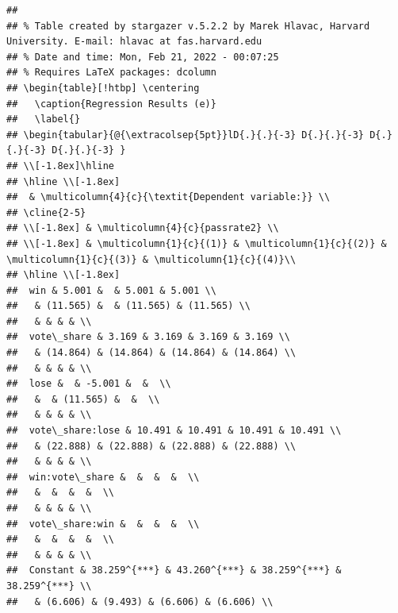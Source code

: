 \documentclass[
  12pt,
  landscape]{article}
\begin{document}
\begin{verbatim}
## 
## % Table created by stargazer v.5.2.2 by Marek Hlavac, Harvard University. E-mail: hlavac at fas.harvard.edu
## % Date and time: Mon, Feb 21, 2022 - 00:07:25
## % Requires LaTeX packages: dcolumn 
## \begin{table}[!htbp] \centering 
##   \caption{Regression Results (e)} 
##   \label{} 
## \begin{tabular}{@{\extracolsep{5pt}}lD{.}{.}{-3} D{.}{.}{-3} D{.}{.}{-3} D{.}{.}{-3} } 
## \\[-1.8ex]\hline 
## \hline \\[-1.8ex] 
##  & \multicolumn{4}{c}{\textit{Dependent variable:}} \\ 
## \cline{2-5} 
## \\[-1.8ex] & \multicolumn{4}{c}{passrate2} \\ 
## \\[-1.8ex] & \multicolumn{1}{c}{(1)} & \multicolumn{1}{c}{(2)} & \multicolumn{1}{c}{(3)} & \multicolumn{1}{c}{(4)}\\ 
## \hline \\[-1.8ex] 
##  win & 5.001 &  & 5.001 & 5.001 \\ 
##   & (11.565) &  & (11.565) & (11.565) \\ 
##   & & & & \\ 
##  vote\_share & 3.169 & 3.169 & 3.169 & 3.169 \\ 
##   & (14.864) & (14.864) & (14.864) & (14.864) \\ 
##   & & & & \\ 
##  lose &  & -5.001 &  &  \\ 
##   &  & (11.565) &  &  \\ 
##   & & & & \\ 
##  vote\_share:lose & 10.491 & 10.491 & 10.491 & 10.491 \\ 
##   & (22.888) & (22.888) & (22.888) & (22.888) \\ 
##   & & & & \\ 
##  win:vote\_share &  &  &  &  \\ 
##   &  &  &  &  \\ 
##   & & & & \\ 
##  vote\_share:win &  &  &  &  \\ 
##   &  &  &  &  \\ 
##   & & & & \\ 
##  Constant & 38.259^{***} & 43.260^{***} & 38.259^{***} & 38.259^{***} \\ 
##   & (6.606) & (9.493) & (6.606) & (6.606) \\ 

\end{verbatim}
\end{document}
